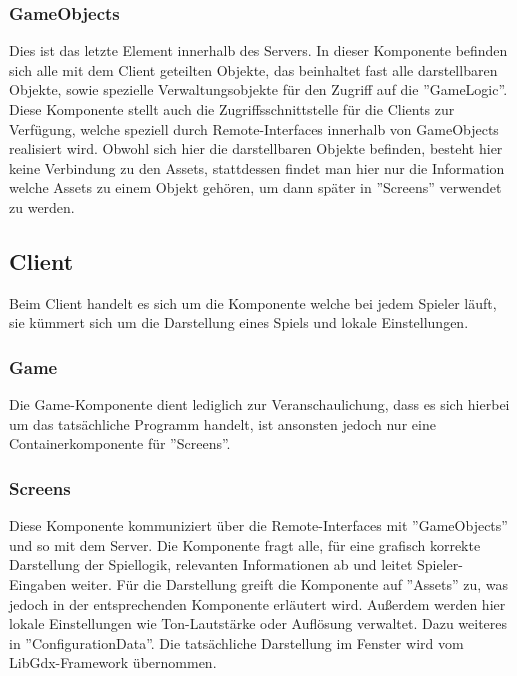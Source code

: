 \documentclass[fontsize=12pt,paper=a4,twoside]{scrartcl}
\begin{document}
\subsubsection{GameObjects}

Dies ist das letzte Element innerhalb des Servers. In dieser Komponente befinden sich alle mit dem Client geteilten Objekte, das beinhaltet fast alle darstellbaren Objekte, sowie spezielle Verwaltungsobjekte für den Zugriff auf die ''GameLogic''. Diese Komponente stellt auch die Zugriffsschnittstelle für die Clients zur Verfügung, welche speziell durch Remote-Interfaces innerhalb von GameObjects realisiert wird. Obwohl sich hier die darstellbaren Objekte befinden, besteht hier keine Verbindung zu den Assets, stattdessen findet man hier nur die Information welche Assets zu einem Objekt gehören, um dann später in ''Screens'' verwendet zu werden.

\subsection{Client}

Beim Client handelt es sich um die Komponente welche bei jedem Spieler läuft, sie kümmert sich um die Darstellung eines Spiels und lokale Einstellungen.

\subsubsection{Game}

Die Game-Komponente dient lediglich zur Veranschaulichung, dass es sich hierbei um das tatsächliche Programm handelt, ist ansonsten jedoch nur eine Containerkomponente für ''Screens''.

\subsubsection{Screens}

Diese Komponente kommuniziert über die Remote-Interfaces mit ''GameObjects'' und so mit dem Server. Die Komponente fragt alle, für eine grafisch korrekte Darstellung der Spiellogik, relevanten Informationen ab und leitet Spieler-Eingaben weiter. Für die Darstellung greift die Komponente auf ''Assets'' zu, was jedoch in der entsprechenden Komponente erläutert wird. Außerdem werden hier lokale Einstellungen wie Ton-Lautstärke oder Auflösung verwaltet. Dazu weiteres in ''ConfigurationData''. Die tatsächliche Darstellung im Fenster wird vom LibGdx-Framework übernommen.
\end{document}
